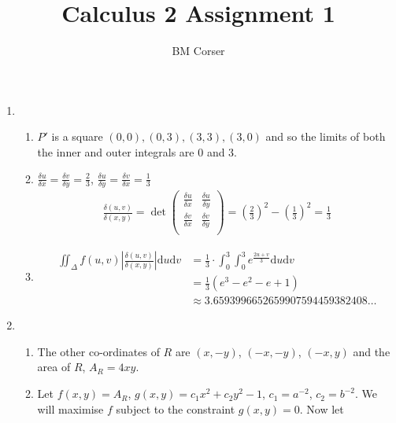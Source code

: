 \documentclass[10pt]{article}
\author{BM Corser}
\title{Calculus 2 Assignment 1}
\date{}
\begin{document}
    \maketitle 
    \begin{enumerate}
            \item 
    \begin{enumerate}
        \item $P'$ is a square $(0,0), (0,3), (3,3), (3, 0)$ and so the limits
            of both the inner and outer integrals are 0 and 3.
        \item $\frac{\delta u}{\delta x} = \frac{\delta v}{\delta y} = \frac{2}{3}$, 
              $\frac{\delta u}{\delta y} = \frac{\delta v}{\delta x} = \frac{1}{3}$
            \begin{align*}
                \frac{\delta(u,v)}{\delta(x,y)}
                = \det \left(
                \begin{array}{cc}
                    \tfrac{\delta u}{\delta x} & \tfrac{\delta u}{\delta y} \\
                    \tfrac{\delta v}{\delta x} & \tfrac{\delta v}{\delta y} \\
                \end{array}
                \right)
                = \left(\frac{2}{3}\right)^2 - \left(\frac{1}{3}\right)^2 = \frac{1}{3}
            \end{align*}
        \item
            \begin{align*}
                \iint_\Delta f(u,v) \left|\frac{\delta(u,v)}{\delta(x,y)}\right| \text{d}u\text{d}v
                &= \frac{1}{3} \cdot \int_0^3\int_0^3 e^{\frac{2u+v}{3}} \text{d}u\text{d}v \\
                &= \tfrac{1}{3}(e^3 - e^2 - e +1) \\
                &\approx 3.6593996652659907594459382408\dots
            \end{align*}
        \end{enumerate}
        \item
            \begin{enumerate}
                \item The other co-ordinates of $R$ are $(x, -y)$, $(-x, -y)$, $(-x, y)$ and the area of $R$, $A_R = 4xy$.
                \item Let $f(x,y) = A_R$, $g(x,y) = c_1x^2 + c_2y^2 - 1$, $c_1
                    = a^{-2}$, $c_2 = b^{-2}$. We will maximise $f$ subject to
                    the constraint $g(x,y) = 0$. Now let

\end{enumerate}
\end{enumerate}
\end{document}
